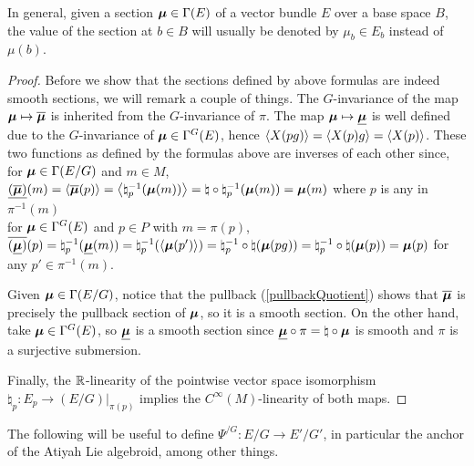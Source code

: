 In general, given a section $\bm{\mu} \in \Gamma(E)$ of a vector bundle $E$ over a base space $B$, the value of the section at $b\in B$ will usually be denoted by $\mu_b \in E_b$ instead of $\mu(b)$.

\begin{proof}
Before we show that the sections defined by above formulas are indeed smooth sections, we will remark a couple of things. The $G$-invariance of the map $\bm{\mathfrak{\mu}} \mapsto \overline{\bm{\mathfrak{\mu}}}$ is inherited from the $G$-invariance of $\pi$. The map $\bm{\mu} \mapsto \underline{\bm{\mu}}$ is well defined due to the $G$-invariance of $\bm{\mu} \in \Gamma^G(E)$, hence $\left\langle X(pg) \right\rangle = \left\langle X(p)g \right\rangle = \left\langle X(p) \right\rangle$. These two functions as defined by the formulas above are inverses of each other since, \\
for $\bm{\mathfrak{\mu}} \in \Gamma(E/G)$ and $m \in M$, $\underline{(\overline{\bm{\mathfrak{\mu}}})}(m) = \left\langle \overline{\bm{\mathfrak{\mu}}} (p) \right\rangle = \left\langle  \natural_p^{-1}(\bm{\mathfrak{\mu}}(m))  \right\rangle = \natural \circ \natural_p^{-1}(\bm{\mathfrak{\mu}}(m)) = \bm{\mathfrak{\mu}}(m)$ where $p$ is any in $\pi^{-1}(m)$ \\
for $\bm{\mu} \in \Gamma^G(E)$ and $p \in P$ with $m = \pi(p)$, $\overline{(\underline{\bm{\mu}})}(p) = \natural_p^{-1}(\underline{\bm{\mu}}(m)) = \natural_p^{-1}(\left\langle \bm{\mu}(p') \right\rangle) = \natural_p^{-1} \circ \natural (\bm{\mu}(pg)) = \natural_p^{-1} \circ \natural (\bm{\mu}(p)) = \bm{\mu}(p)$ for any $p' \in \pi^{-1}(m)$.

Given $\bm{\mathfrak{\mu}} \in \Gamma(E/G)$, notice that the pullback (\ref{pullbackQuotient}) shows that $\overline{\bm{\mathfrak{\mu}}}$ is precisely the pullback section of $\bm{\mathfrak{\mu}}$, so it is a smooth section. On the other hand, take $\bm{\mu} \in \Gamma^G(E)$, so $\underline{\bm{\mu}}$ is a smooth section since $\underline{\bm{\mu}} \circ \pi = \natural \circ \bm{\mu}$ is smooth and $\pi$ is a surjective submersion.

Finally, the $\mathbb{R}$-linearity of the pointwise vector space isomorphism $\natural_p:E_p \to (E/G)|_{\pi(p)}$ implies the $C^{\infty}(M)$-linearity of both maps.

\end{proof}

The following will be useful to define $\Psi^{/G}: E/G \to E'/G'$, in particular the anchor of the Atiyah Lie algebroid, among other things. 

